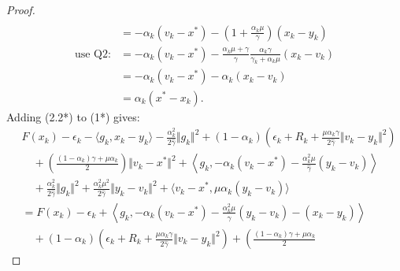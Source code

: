 \documentclass[12pt]{article}
\begin{document}
\begin{proof}
\begin{align*}
            \\
            &= 
            -\alpha_k(v_k - x^*) -
            \left(
                1 + \frac{\alpha_k \mu}{\gamma}
            \right)(x_k - y_k)
            \\
            \text{use Q2}: 
            &= 
            -\alpha_k(v_k - x^*) - 
            \frac{\alpha_k \mu + \gamma}{\gamma}
            \frac{\alpha_k \gamma}{\gamma_k + \alpha_k \mu}(x_k - v_k)
            \\
            &= 
            -\alpha_k(v_k - x^*)
            - \alpha_k(x_k - v_k)
            \\
            &= \alpha_k(x^* - x_k). 
        \tag{Q3}
        \end{align*}
        Adding (2.2*) to (1*) gives: 
        \begin{align*}
            &
            F(x_k) - \epsilon_k - \langle  g_k, x_k - y_k\rangle
            - \frac{\alpha_k^2}{2\hat \gamma}\Vert g_k\Vert^2
            + (1 - \alpha_k)
            \left(
                \epsilon_k + R_k + 
                \frac{\mu\alpha_k\gamma}{2\hat \gamma}
                \Vert v_k - y_k\Vert^2
            \right)
            \\
            &\quad 
                + 
                \left(
                \frac{(1 - \alpha_k)\gamma + \mu \alpha_k}{2} 
                \right)\Vert v_k - x^*\Vert^2
                + 
                \left\langle g_k, 
                    - \alpha_k(v_k - x^*) 
                    - \frac{\alpha_k^2\mu}{\hat \gamma}(y_k - v_k)
                \right\rangle
            \\
            & \quad 
                + \frac{\alpha_k^2}{2\hat \gamma}\Vert g_k\Vert^2
                + \frac{\alpha_k^2 \mu^2}{2\hat \gamma}\Vert y_k - v_k\Vert^2
                + \langle v_k - x^*, \mu\alpha_k(y_k - v_k)\rangle
            \\
            &= 
            F(x_k) - \epsilon_k 
            + \left\langle 
                g_k, 
                - \alpha_k(v_k - x^*) 
                - \frac{\alpha_k^2\mu}{\hat \gamma}(y_k - v_k)
                - (x_k - y_k)
            \right\rangle
            \\
            &\quad 
                + (1 - \alpha_k)
                \left(
                    \epsilon_k + R_k + 
                    \frac{\mu\alpha_k\gamma}{2\hat \gamma}
                    \Vert v_k - y_k\Vert^2
                \right)
                + 
                \left(
                \frac{(1 - \alpha_k)\gamma + \mu \alpha_k}{2} 

\end{align*}
\end{proof}
\end{document}
